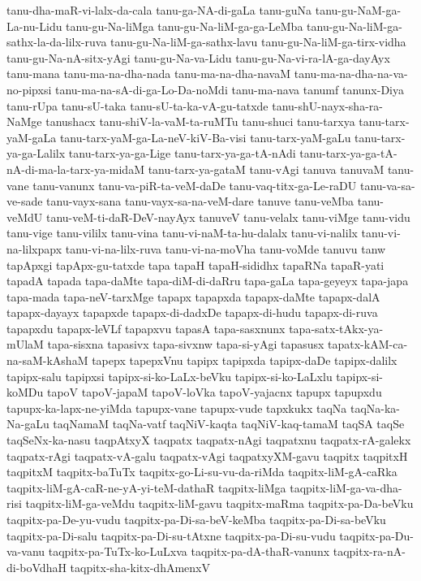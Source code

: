 {tanu-dha-maR-vi-lalx-da-cala
tanu-ga-NA-di-gaLa
tanu-guNa
tanu-gu-NaM-ga-La-nu-Lidu
tanu-gu-Na-liMga
tanu-gu-Na-liM-ga-ga-LeMba
tanu-gu-Na-liM-ga-sathx-la-da-lilx-ruva
tanu-gu-Na-liM-ga-sathx-lavu
tanu-gu-Na-liM-ga-tirx-vidha
tanu-gu-Na-nA-sitx-yAgi
tanu-gu-Na-va-Lidu
tanu-gu-Na-vi-ra-lA-ga-dayAyx
tanu-mana
tanu-ma-na-dha-nada
tanu-ma-na-dha-navaM
tanu-ma-na-dha-na-va-no-pipxsi
tanu-ma-na-sA-di-ga-Lo-Da-noMdi
tanu-ma-nava
tanumf
tanunx-Diya
tanu-rUpa
tanu-sU-taka
tanu-sU-ta-ka-vA-gu-tatxde
tanu-shU-nayx-sha-ra-NaMge
tanushacx
tanu-shiV-la-vaM-ta-ruMTu
tanu-shuci
tanu-tarxya
tanu-tarx-yaM-gaLa
tanu-tarx-yaM-ga-La-neV-kiV-Ba-visi
tanu-tarx-yaM-gaLu
tanu-tarx-ya-ga-Lalilx
tanu-tarx-ya-ga-Lige
tanu-tarx-ya-ga-tA-nAdi
tanu-tarx-ya-ga-tA-nA-di-ma-la-tarx-ya-midaM
tanu-tarx-ya-gataM
tanu-vAgi
tanuva
tanuvaM
tanu-vane
tanu-vanunx
tanu-va-piR-ta-veM-daDe
tanu-vaq-titx-ga-Le-raDU
tanu-va-sa-ve-sade
tanu-vayx-sana
tanu-vayx-sa-na-veM-dare
tanuve
tanu-veMba
tanu-veMdU
tanu-veM-ti-daR-DeV-nayAyx
tanuveV
tanu-velalx
tanu-viMge
tanu-vidu
tanu-vige
tanu-vililx
tanu-vina
tanu-vi-naM-ta-hu-dalalx
tanu-vi-nalilx
tanu-vi-na-lilxpapx
tanu-vi-na-lilx-ruva
tanu-vi-na-moVha
tanu-voMde
tanuvu
tanw
tapApxgi
tapApx-gu-tatxde
tapa
tapaH
tapaH-sididhx
tapaRNa
tapaR-yati
tapadA
tapada
tapa-daMte
tapa-diM-di-daRru
tapa-gaLa
tapa-geyeyx
tapa-japa
tapa-mada
tapa-neV-tarxMge
tapapx
tapapxda
tapapx-daMte
tapapx-dalA
tapapx-dayayx
tapapxde
tapapx-di-dadxDe
tapapx-di-hudu
tapapx-di-ruva
tapapxdu
tapapx-leVLf
tapapxvu
tapasA
tapa-sasxnunx
tapa-satx-tAkx-ya-mUlaM
tapa-sisxna
tapasivx
tapa-sivxnw
tapa-si-yAgi
tapasusx
tapatx-kAM-ca-na-saM-kAshaM
tapepx
tapepxVnu
tapipx
tapipxda
tapipx-daDe
tapipx-dalilx
tapipx-salu
tapipxsi
tapipx-si-ko-LaLx-beVku
tapipx-si-ko-LaLxlu
tapipx-si-koMDu
tapoV
tapoV-japaM
tapoV-loVka
tapoV-yajacnx
tapupx
tapupxdu
tapupx-ka-lapx-ne-yiMda
tapupx-vane
tapupx-vude
tapxkukx
taqNa
taqNa-ka-Na-gaLu
taqNamaM
taqNa-vatf
taqNiV-kaqta
taqNiV-kaq-tamaM
taqSA
taqSe
taqSeNx-ka-nasu
taqpAtxyX
taqpatx
taqpatx-nAgi
taqpatxnu
taqpatx-rA-galekx
taqpatx-rAgi
taqpatx-vA-galu
taqpatx-vAgi
taqpatxyXM-gavu
taqpitx
taqpitxH
taqpitxM
taqpitx-baTuTx
taqpitx-go-Li-su-vu-da-riMda
taqpitx-liM-gA-caRka
taqpitx-liM-gA-caR-ne-yA-yi-teM-dathaR
taqpitx-liMga
taqpitx-liM-ga-va-dha-risi
taqpitx-liM-ga-veMdu
taqpitx-liM-gavu
taqpitx-maRma
taqpitx-pa-Da-beVku
taqpitx-pa-De-yu-vudu
taqpitx-pa-Di-sa-beV-keMba
taqpitx-pa-Di-sa-beVku
taqpitx-pa-Di-salu
taqpitx-pa-Di-su-tAtxne
taqpitx-pa-Di-su-vudu
taqpitx-pa-Du-va-vanu
taqpitx-pa-TuTx-ko-LuLxva
taqpitx-pa-dA-thaR-vanunx
taqpitx-ra-nA-di-boVdhaH
taqpitx-sha-kitx-dhAmenxV
}
